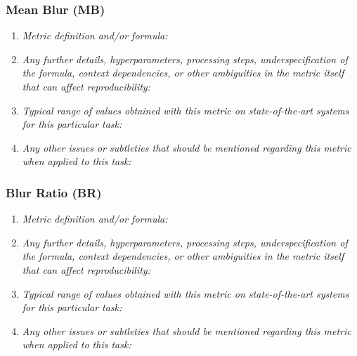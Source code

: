 \documentclass[a4paper,11pt]{article}
\begin{document}
        \subsubsection{Mean Blur (MB)}
            \begin{enumerate}[label=\alph*.]
                \item \textit{Metric definition and/or formula:}
                \bigskip
                \item \textit{Any further details, hyperparameters, processing steps, underspecification of the formula, context dependencies, or other ambiguities in the metric itself that can affect reproducibility:}
                \bigskip
                \item \textit{Typical range of values obtained with this metric on state-of-the-art systems for this particular task:}
                \bigskip
                \item \textit{Any other issues or subtleties that should be mentioned regarding this metric when applied to this task:}
                \bigskip
            \end{enumerate}
        \subsubsection{Blur Ratio (BR)}
            \begin{enumerate}[label=\alph*.]
                \item \textit{Metric definition and/or formula:}
                \bigskip
                \item \textit{Any further details, hyperparameters, processing steps, underspecification of the formula, context dependencies, or other ambiguities in the metric itself that can affect reproducibility:}
                \bigskip
                \item \textit{Typical range of values obtained with this metric on state-of-the-art systems for this particular task:}
                \bigskip
                \item \textit{Any other issues or subtleties that should be mentioned regarding this metric when applied to this task:}
                \bigskip
            \end{enumerate}
\end{document}
